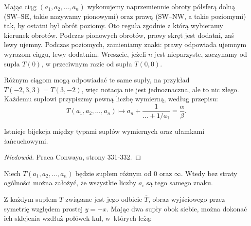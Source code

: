 Mając ciąg $(a_1, a_2, \ldots, a_n)$ wykonujemy naprzemiennie obroty półsferą dolną (SW--SE, takie nazywamy pionowymi) oraz prawą (SW--NW, a takie poziomymi) tak, by ostatni był obrót poziomy.
Oto reguła zgodnie z którą wybieramy kierunek obrotów.
Podczas pionowych obrotów, prawy skręt jest dodatni, zaś lewy ujemny.
Podczas poziomych, zamieniamy znaki: prawy odpowiada ujemnym wyrazom ciągu, lewy dodatnim.
Wreszcie, jeżeli $n$ jest nieparzyste, zaczynamy od supła $T(0)$, w przeciwnym razie od supła $T(0, 0)$.

Różnym ciągom mogą odpowiadać te same supły, na przykład $T(-2, 3, 3) = T(3, -2)$, więc notacja nie jest jednoznaczna, ale to nic złego.
Każdemu supłowi przypiszmy pewną liczbę wymierną, według przepisu:
\begin{equation}
    T(a_1, a_2, \ldots, a_n) \mapsto a_n + \frac{1}{\ldots + 1/a_1} = \frac \alpha \beta.
\end{equation}

\begin{proposition}
    Istnieje bijekcja między typami supłów wymiernych oraz ułamkami łańcuchowymi.
\end{proposition}

\begin{proof}[Niedowód]
    Praca \cite{conway70} Conwaya, strony 331-332.
\end{proof}

\begin{proposition}
    \label{prp:continued_fractions}
    Niech $T(a_1, a_2, \ldots, a_n)$ będzie supłem różnym od $0$ oraz $\infty$.
    Wtedy bez straty ogólności można założyć, że wszystkie liczby $a_i$ są tego samego znaku.
\end{proposition}

Z każdym supłem $T$ związane jest jego odbicie $\overline T$, obraz wyjściowego przez symetrię względem prostej $y = -x$.
Mając dwa supły obok siebie, można dokonać ich sklejenia wzdłuż połówek kul, w~których leżą:
\begin{comment}
\begin{figure}[H]
    \centering
    \begin{minipage}[b]{.23\linewidth}
        \[
            \LargeTangleSummandA
        \]
        \subcaption{jakiś supeł}
    \end{minipage}
    \begin{minipage}[b]{.23\linewidth}
        \centering
        \[
            \LargeTangleSummandB
        \]
        \subcaption{jakiś inny supeł}
    \end{minipage}
    \begin{minipage}[b]{.48\linewidth}
        \centering
        \[
            \LargeTangleSumAB
        \]
        \subcaption{suma tych supłów}
    \end{minipage}
\end{figure}
\end{comment}

